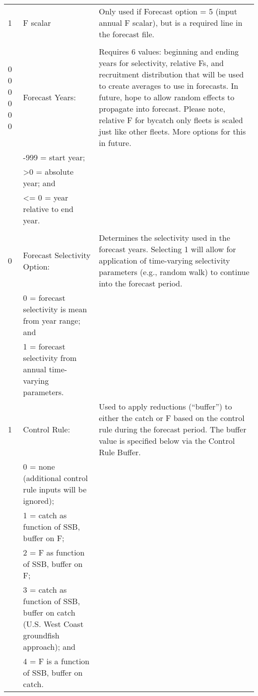 \begin{landscape}
{\begin{longtable}{p{3.2cm} p{7cm} p{10.8cm}}
  \hline
  1 & F scalar & \multirow{1}{1cm}[-0.15cm]{\parbox{11cm}{Only used if Forecast option = 5 (input annual F scalar), but is a required line in the forecast file.}} \Tstrut\Bstrut\\
    & & \\

  \hline
  0 0 0 0 0 0 & Forecast Years: & \multirow{1}{1cm}[-0.15cm]{\parbox{11cm}{Requires 6 values: beginning and ending years for selectivity, relative Fs, and recruitment distribution that will be used to create averages to use in forecasts. In future, hope to allow random effects to propagate into forecast. Please note, relative F for bycatch only fleets is scaled just like other fleets. More options for this in future.}} \Tstrut\\
    & -999 = start year; & \\
    & >0 = absolute year; and & \\
    & <= 0 = year relative to end year. & \\
    & & \Bstrut\\

  \pagebreak
  0 & Forecast Selectivity Option: & \multirow{1}{1cm}[-0.15cm]{\parbox{11cm}{Determines the selectivity used in the forecast years. Selecting 1 will allow for application of time-varying selectivity parameters (e.g., random walk) to continue into the forecast period.}} \Tstrut\\
    & 0 = forecast selectivity is mean from year range; and & \\
    & 1 = forecast selectivity from annual time-varying parameters. & \Bstrut\\

  \hline
  1 & Control Rule: & \multirow{1}{1cm}[-0.15cm]{\parbox{11cm}{Used to apply reductions (``buffer'') to either the catch or F based on the control rule during the forecast period. The buffer value is specified below via the Control Rule Buffer.}} \Tstrut\\
    & 0 = none (additional control rule inputs will be ignored); & \\
    & 1 = catch as function of SSB, buffer on F; & \\
    & 2 = F as function of SSB, buffer on F; & \\
    & 3 = catch as function of SSB, buffer on catch (U.S. West Coast groundfish approach); and & \\
    & 4 = F is a function of SSB, buffer on catch. & \Bstrut\\
  \hline



\end{longtable}}
\end{landscape}
